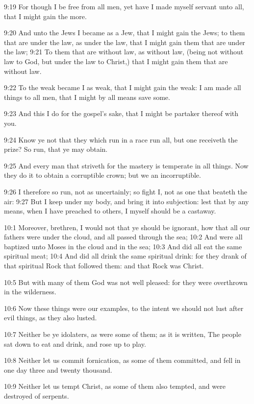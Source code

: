 9:19 For though I be free from all men, yet have I made myself servant unto all, that I might gain the more.

9:20 And unto the Jews I became as a Jew, that I might gain the Jews; to them that are under the law, as under the law, that I might gain them that are under the law; 9:21 To them that are without law, as without law, (being not without law to God, but under the law to Christ,) that I might gain them that are without law.

9:22 To the weak became I as weak, that I might gain the weak: I am made all things to all men, that I might by all means save some.

9:23 And this I do for the gospel's sake, that I might be partaker thereof with you.

9:24 Know ye not that they which run in a race run all, but one receiveth the prize? So run, that ye may obtain.

9:25 And every man that striveth for the mastery is temperate in all things. Now they do it to obtain a corruptible crown; but we an incorruptible.

9:26 I therefore so run, not as uncertainly; so fight I, not as one that beateth the air: 9:27 But I keep under my body, and bring it into subjection: lest that by any means, when I have preached to others, I myself should be a castaway.

10:1 Moreover, brethren, I would not that ye should be ignorant, how that all our fathers were under the cloud, and all passed through the sea; 10:2 And were all baptized unto Moses in the cloud and in the sea; 10:3 And did all eat the same spiritual meat; 10:4 And did all drink the same spiritual drink: for they drank of that spiritual Rock that followed them: and that Rock was Christ.

10:5 But with many of them God was not well pleased: for they were overthrown in the wilderness.

10:6 Now these things were our examples, to the intent we should not lust after evil things, as they also lusted.

10:7 Neither be ye idolaters, as were some of them; as it is written, The people sat down to eat and drink, and rose up to play.

10:8 Neither let us commit fornication, as some of them committed, and fell in one day three and twenty thousand.

10:9 Neither let us tempt Christ, as some of them also tempted, and were destroyed of serpents.

